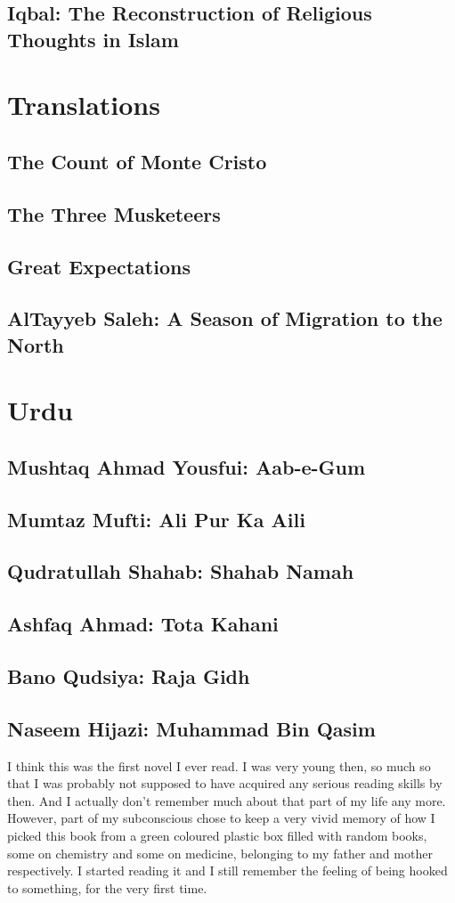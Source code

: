 \documentclass[letterpaper,11pt]{article}
\begin{document}
\subsection*{Iqbal: The Reconstruction of Religious Thoughts in Islam}

\section*{Translations}
\subsection*{The Count of Monte Cristo}
\subsection*{The Three Musketeers}
\subsection*{Great Expectations}
\subsection*{AlTayyeb Saleh: A Season of Migration to the North}
\section*{Urdu}
\subsection*{Mushtaq Ahmad Yousfui: Aab-e-Gum}
\subsection*{Mumtaz Mufti: Ali Pur Ka Aili}
\subsection*{Qudratullah Shahab: Shahab Namah}
\subsection*{Ashfaq Ahmad: Tota Kahani}
\subsection*{Bano Qudsiya: Raja Gidh}
\subsection*{Naseem Hijazi: Muhammad Bin Qasim}
I think this was the first novel I ever read. I was
very young then, so much so that I was probably not
supposed to have acquired any serious reading 
skills by then. And I actually don't remember
much about that part of my life any more.  However, part of 
my subconscious chose to keep a very vivid memory of 
how I picked this book from a 
green coloured plastic box filled with random books, some 
on chemistry and some on medicine, belonging to my father
and mother respectively. I started reading it and I still 
remember the feeling of being hooked to something, for the 
very first time.





\end{document}
